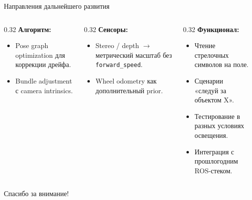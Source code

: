 \documentclass[aspectratio=169]{beamer}
\newcommand{\code}[1]{\texttt{#1}}
\begin{document}
\begin{frame}{Направления дальнейшего развития}
    \begin{columns}[t]
        \begin{column}{0.32\textwidth}
            \textbf{Алгоритм:}
            \begin{itemize}
                \item Pose graph optimization для коррекции дрейфа.
                \item Bundle adjustment с camera intrinsics.
            \end{itemize}
        \end{column}
        \begin{column}{0.32\textwidth}
            \textbf{Сенсоры:}
            \begin{itemize}
                \item Stereo / depth $\to$ метрический масштаб без \code{forward\_speed}.
                \item Wheel odometry как дополнительный prior.
            \end{itemize}
        \end{column}
        \begin{column}{0.32\textwidth}
            \textbf{Функционал:}
            \begin{itemize}
                \item Чтение стрелочных символов на поле.
                \item Сценарии «следуй за объектом X».
                \item Тестирование в разных условиях освещения.
                \item Интеграция с прошлогодним ROS-стеком.
            \end{itemize}
        \end{column}
    \end{columns}
\end{frame}

\begin{frame}
    \begin{center}
        \vspace{1.5cm}
        {\Huge Спасибо за внимание!}
    \end{center}
\end{frame}
\end{document}

